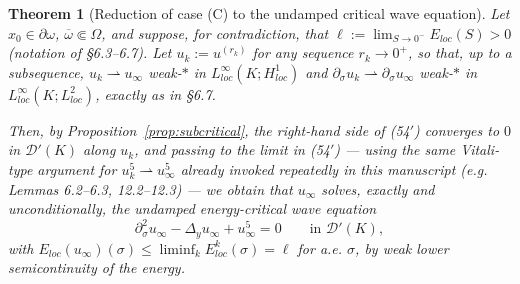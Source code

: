 \documentclass[11pt,letterpaper]{amsart}
\newtheorem{theorem}{Theorem}[section]
\begin{document}
\begin{theorem}[Reduction of case (C) to the undamped critical wave equation]
\label{thm:caseC-reduction}
Let $x_0\in\partial\omega$, $\overline\omega\Subset\Omega$, and suppose, for contradiction,
that $\ell := \lim_{S\to0^-} E_{loc}(S) > 0$ (notation of \S6.3--6.7). Let
$u_k := u^{(r_k)}$ for any sequence $r_k\to0^+$, so that, up to a subsequence,
$u_k\rightharpoonup u_\infty$ weak-$*$ in $L^\infty_{loc}(K;H^1_{loc})$ and
$\partial_\sigma u_k \rightharpoonup \partial_\sigma u_\infty$ weak-$*$ in
$L^\infty_{loc}(K;L^2_{loc})$, exactly as in \S6.7.

Then, by Proposition~\ref{prop:subcritical}, the right-hand side of (54$'$) converges to $0$
in $\mathcal D'(K)$ along $u_k$, and passing to the limit in (54$'$) — using the same
Vitali-type argument for $u_k^5\rightharpoonup u_\infty^5$ already invoked repeatedly in this
manuscript (e.g. Lemmas 6.2--6.3, 12.2--12.3) — we obtain that $u_\infty$ solves,
\emph{exactly and unconditionally}, the undamped energy-critical wave equation
\[
\partial_\sigma^2 u_\infty - \Delta_y u_\infty + u_\infty^5 = 0 \qquad \text{in } \mathcal D'(K),
\]
with $E_{loc}(u_\infty)(\sigma) \le \liminf_k E_{loc}^k(\sigma) = \ell$ for a.e. $\sigma$, by
weak lower semicontinuity of the energy.
\end{theorem}
\end{document}
